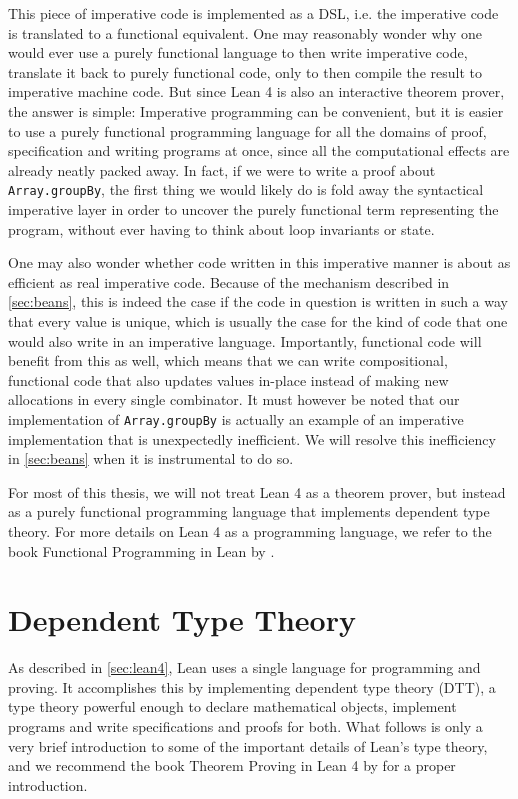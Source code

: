 This piece of imperative code is implemented as a DSL, i.e. the imperative code is translated to a functional equivalent.
One may reasonably wonder why one would ever use a purely functional language to then write imperative code, translate it back to purely functional code, only to then compile the result to imperative machine code. But since Lean 4 is also an interactive theorem prover, the answer is simple: Imperative programming can be convenient, but it is easier to use a purely functional programming language for all the domains of proof, specification and writing programs at once, since all the computational effects are already neatly packed away. In fact, if we were to write a proof about \lstinline|Array.groupBy|, the first thing we would likely do is fold away the syntactical imperative layer in order to uncover the purely functional term representing the program, without ever having to think about loop invariants or state.

One may also wonder whether code written in this imperative manner is about as efficient as real imperative code. Because of the mechanism described in \cref{sec:beans}, this is indeed the case if the code in question is written in such a way that every value is unique, which is usually the case for the kind of code that one would also write in an imperative language. Importantly, functional code will benefit from this as well, which means that we can write compositional, functional code that also updates values in-place instead of making new allocations in every single combinator. It must however be noted that our implementation of \lstinline|Array.groupBy| is actually an example of an imperative implementation that is unexpectedly inefficient. We will resolve this inefficiency in \cref{sec:beans} when it is instrumental to do so.

For most of this thesis, we will not treat Lean 4 as a theorem prover, but instead as a purely functional programming language that implements dependent type theory. For more details on Lean 4 as a programming language, we refer to the book Functional Programming in Lean by \cite{christiansen_functional_2023}.

\section{Dependent Type Theory}\label{sec:dtt}
As described in \cref{sec:lean4}, Lean uses a single language for programming and proving. It accomplishes this by implementing dependent type theory (DTT), a type theory powerful enough to declare mathematical objects, implement programs and write specifications and proofs for both. What follows is only a very brief introduction to some of the important details of Lean's type theory, and we recommend the book Theorem Proving in Lean 4 by \cite{avigad_theorem_2022} for a proper introduction.

